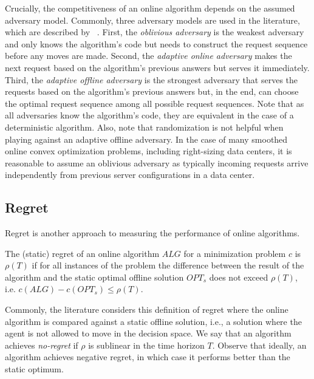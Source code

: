 Crucially, the competitiveness of an online algorithm depends on the assumed adversary model. Commonly, three adversary models are used in the literature, which are described by \citeauthor*{Borodin1990}~\cite{Borodin1990}. First, the \emph{oblivious adversary} is the weakest adversary and only knows the algorithm's code but needs to construct the request sequence before any moves are made. Second, the \emph{adaptive online adversary} makes the next request based on the algorithm's previous answers but serves it immediately. Third, the \emph{adaptive offline adversary} is the strongest adversary that serves the requests based on the algorithm's previous answers but, in the end, can choose the optimal request sequence among all possible request sequences. Note that as all adversaries know the algorithm's code, they are equivalent in the case of a deterministic algorithm. Also, note that randomization is not helpful when playing against an adaptive offline adversary. In the case of many smoothed online convex optimization problems, including right-sizing data centers, it is reasonable to assume an oblivious adversary as typically incoming requests arrive independently from previous server configurations in a data center.

\subsection{Regret}

Regret is another approach to measuring the performance of online algorithms.

\begin{definition}
The (static) regret of an online algorithm $ALG$ for a minimization problem $c$ is $\rho(T)$ if for all instances of the problem the difference between the result of the algorithm and the static optimal offline solution $OPT_s$ does not exceed $\rho(T)$, i.e. $c(ALG) - c(OPT_s) \leq \rho(T)$.
\end{definition}

Commonly, the literature considers this definition of regret where the online algorithm is compared against a static offline solution, i.e., a solution where the agent is not allowed to move in the decision space. We say that an algorithm achieves \emph{no-regret} if $\rho$ is sublinear in the time horizon $T$. Observe that ideally, an algorithm achieves negative regret, in which case it performs better than the static optimum.

